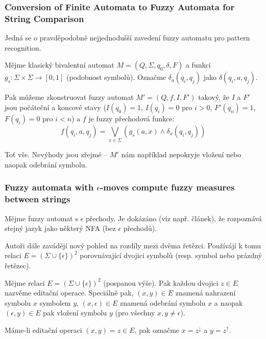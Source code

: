 \documentclass[a4paper,10pt]{article}
\begin{document}


\subsubsection*{Conversion of Finite Automata to Fuzzy Automata for String Comparison \cite{RamGir-ConvFinAutFuzzAutStrComp}}

Jedná se o pravděpodobně nejjednodušší zavedení fuzzy automatu pro pattern recognition.

Mějme klasický bivalentní automat $M = (Q, \Sigma, q_0, \delta, F)$ a funkci $g_s: \Sigma \times \Sigma \rightarrow [0,1]$ (podobnost symbolů). Označme $\delta_a (q_i, q_j)$ jako $\delta(q_i, a, q_j)$.

Pak můžeme zkonstruovat fuzzy automat $M' = (Q, f, I, F')$ takový, že $I$ a $F'$ jsou počáteční a koncové stavy ($I(q_0) = 1$, $I(q_i) = 0$ pro $i > 0$, $F'(q_n) = 1$, $F(q_i) = 0$ pro $i < n$) a $f$ je fuzzy přechodová funkce:
$$
  f(q_i, a, q_j) = \bigvee_{x \in \Sigma} (g_s(a, x) \wedge \delta_x(q_i, q_j))
$$

Toť vše. Nevýhody jsou zřejmé -- $M'$ nám například nepokryje vložení nebo naopak odebrání symbolu.

\subsubsection*{Fuzzy automata with $\epsilon$-moves compute fuzzy measures between strings \cite{AstGonMenGar-FuzzAutEpsMovCmpFuzzMeasBtwStrs}}

Mějme fuzzy automat s $\epsilon$ přechody. Je dokázáno (viz např. článek), že rozpoznává stejný jazyk jako některý NFA (bez $\epsilon$ přechodů).

Autoři dále zavádějí nový pohled na rozdíly mezi dvěma řetězci. Používájí k tomu relaci $E = (\Sigma \cup \{ \epsilon \})^2$ porovnávající dvojici symbolů (resp. symbol nebo prázdný řetězec). 

\begin{definition}
Mějme relaci $E = (\Sigma \cup \{ \epsilon \})^2$ (pospanou výše). Pak každou dvojici $z \in E$ nazvěme editační operace. Speciálně pak, $(x, y) \in E$ znamená nahrazení symbolu $x$ symbolem $y$, $(x, \epsilon) \in E$ znamená odebrání symbolu $x$ a naopak $(\epsilon, y) \in E$ pak vložení symbolu $y$ (pro všechny $x, y \neq \epsilon$). 

Máme-li editační operaci $(x, y) = z \in E$, pak označme $x = z^\downarrow$ a $y = z^\uparrow$.
\end{definition}
\end{document}

